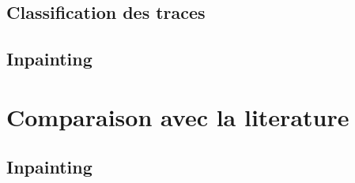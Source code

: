 \documentclass[8pt,twoside=off,titlepage=false, twocolumn]{scrartcl}
\begin{document}
\subsection{Classification des traces}



\subsection{Inpainting}

\section{Comparaison avec la literature}

\subsection{Inpainting}


    
    
\end{document}
